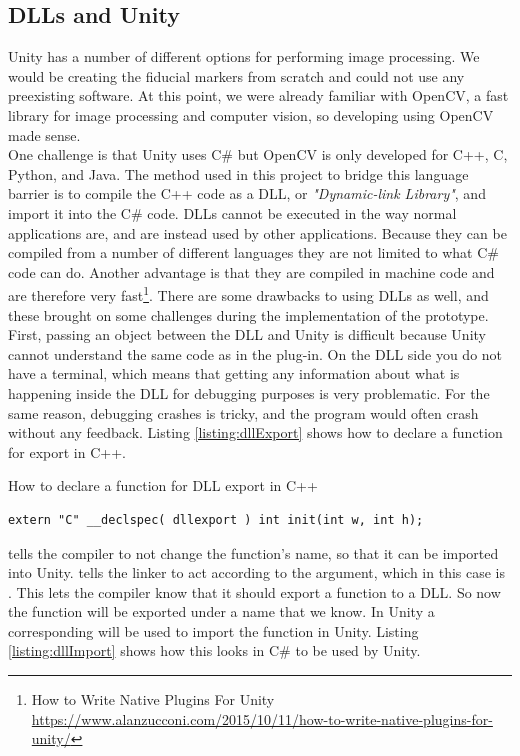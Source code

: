 	\subsection{DLLs and Unity}
 		Unity has a number of different options for performing image processing.  We would be creating the fiducial markers from scratch and could not use any preexisting software. At this point, we were already familiar with OpenCV, a fast library for image processing and computer vision, so developing using OpenCV made sense.\\
 		
		One challenge is that Unity uses C\# but OpenCV is only developed for C++, C, Python, and Java. The method used in this project to bridge this language barrier is to compile the C++ code as a DLL, or \textit{"Dynamic-link Library"}, and import it into the C\# code. DLLs cannot be executed in the way normal applications are, and are instead used by other applications. Because they can be compiled from a number of different languages they are not limited to what C\# code can do. Another advantage is that they are compiled in machine code and are therefore very fast\footnote{How to Write Native Plugins For Unity \url{https://www.alanzucconi.com/2015/10/11/how-to-write-native-plugins-for-unity/}}. There are some drawbacks to using DLLs as well, and these brought on some challenges during the implementation of the prototype. First, passing an object between the DLL and Unity is difficult because Unity cannot understand the same code as in the plug-in. On the DLL side you do not have a terminal, which means that getting any information about what is happening inside the DLL for debugging purposes is very problematic. For the same reason, debugging crashes is tricky, and the program would often crash without any feedback.  Listing \ref{listing:dllExport} shows how to declare a function for export in C++.
\begin{listing}[H]
\caption{How to declare a function for DLL export in C++}
\label{listing:dllExport}
\begin{verbatim}
extern "C" __declspec( dllexport ) int init(int w, int h);
\end{verbatim}
\end{listing}
 tells the compiler to not change the function's name, so that it can be imported into Unity.  tells the linker to act according to the argument, which in this case is . This lets the compiler know that it should export a function to a DLL. So now the function will be exported under a name that we know. In Unity a corresponding  will be used to import the function in Unity. Listing \ref{listing:dllImport} shows how this looks in C\# to be used by Unity.
